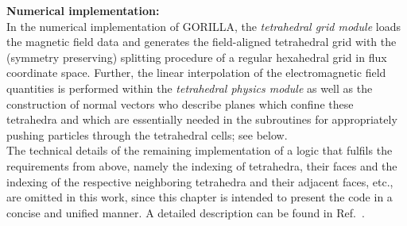 \documentclass{TheMartianReport}
\begin{document}
\textbf{Numerical implementation:}\\
In the numerical implementation of GORILLA, the \textit{tetrahedral grid module} loads the magnetic field data and generates the field-aligned tetrahedral grid with the (symmetry preserving) splitting procedure of a regular hexahedral grid in flux coordinate space. Further, the linear interpolation of the electromagnetic field quantities is performed within the \textit{tetrahedral physics module} as well as the construction of normal vectors who describe planes which confine these tetrahedra and which are essentially needed in the subroutines for appropriately pushing particles through the tetrahedral cells; see below.\\
%
The technical details of the remaining implementation of a logic that fulfils the requirements from above, namely the indexing of tetrahedra, their faces and the indexing of the respective neighboring tetrahedra and their adjacent faces, etc., are omitted in this work, since this chapter is intended to present the code in a concise and unified manner.  A detailed description can be found in Ref.~.
\end{document}
